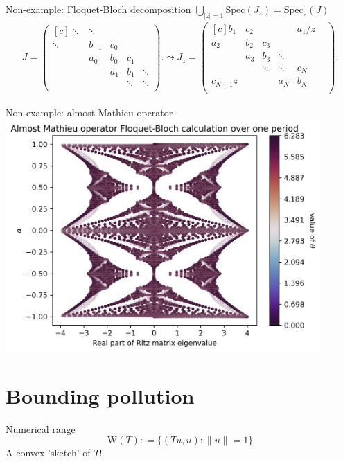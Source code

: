 \documentclass[14pt]{beamer}
\newcommand{\Spec}{\mathrm{Spec}} %
\newcommand{\Num}{\mathrm{W}} %
\newcommand{\eqdef}{\mathrel{\mathop:}=} %
\newcommand{\1}{\mathbf{1}}
\begin{document}
\begin{frame}{Non-example: Floquet-Bloch decomposition}
  \centering
  $\bigcup_{|z|=1} \Spec(J_z) = \Spec_e(J)$ 
  \tiny{
    \begin{align*}
      J=
  \begin{pmatrix*}[c]
    \ddots & \ddots & & & \\
    \ddots & b_{-1} & c_0 & & \\
    & a_0 & b_0 & c_1 & \\
    & & a_1 & b_1 & \ddots \\
    & & & \ddots & \ddots \\
  \end{pmatrix*}.
    \leadsto
    J_z = 
    \begin{pmatrix*}[c]
      b_1 & c_2 & & & a_1/z\\
      a_2 & b_2 & c_3 & & & \\
      & a_3 & b_3 & \ddots & & \\
      & & \ddots & \ddots & c_N & \\
      c_{N+1} z & & & a_N & b_N\\
    \end{pmatrix*}.
    \end{align*}
  }
\end{frame}

\begin{frame}{Non-example: almost Mathieu operator}
  \includegraphics[width=0.9\textwidth]{hofstadter-butterfly}
\end{frame}

\section{Bounding pollution}
\begin{frame}{Numerical range}
  \centering
  $$\Num(T) \eqdef \{(Tu, u) : \|u\| = 1\}$$
  A convex 'sketch' of $T$!
\end{frame}
\end{document}
